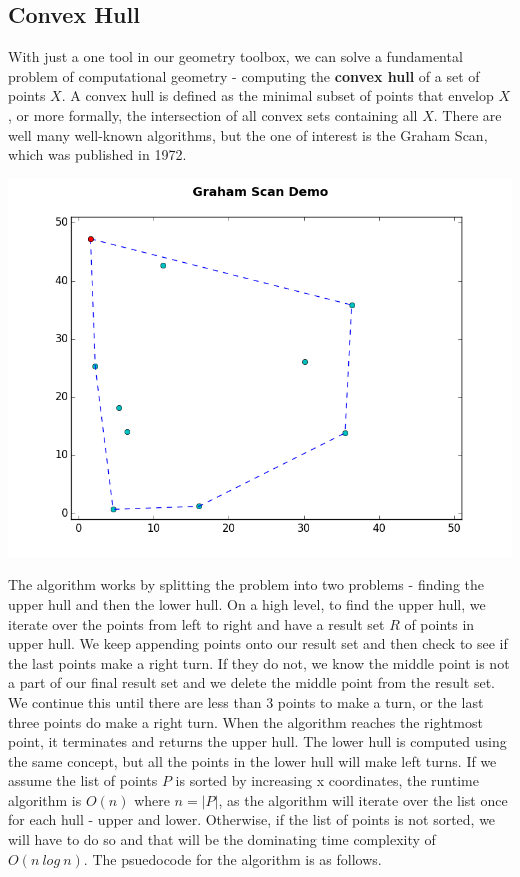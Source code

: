 \documentclass[10pt]{article}
\begin{document}
\begin{multicols}{2}
\subsection{Convex Hull}
\indent With just a one tool in our geometry toolbox, we can solve a fundamental problem of computational geometry - computing the \textbf{convex hull} of a set of points $X$. A convex hull is defined as the minimal subset of points that envelop $X$, or more formally, the intersection of all convex sets containing all $X$. There are well many well-known algorithms, but the one of interest is the Graham Scan, which was published in 1972. \newline \\
\centerline{\includegraphics[scale=0.4]{graham_scan.png}}
\indent The algorithm works by splitting the problem into two problems - finding the upper hull and then the lower hull. On a high level, to find the upper hull, we iterate over the points from left to right and have a result set $R$ of points in upper hull. We keep appending points onto our result set and then check to see if the last points make a right turn. If they do not, we know the middle point is not a part of our final result set and we delete the middle point from the result set. We continue this until there are less than 3 points to make a turn, or the last three points do make a right turn. When the algorithm reaches the rightmost point, it terminates and returns the upper hull. The lower hull is computed using the same concept, but all the points in the lower hull will make left turns. \newline
\indent If we assume the list of points $P$ is sorted by increasing x coordinates, the runtime algorithm is $O(n)$ where $n = |P|$, as the algorithm will iterate over the list once for each hull - upper and lower. Otherwise, if the list of points is not sorted, we will have to do so and that will be the dominating time complexity of $O(n\ log\ n)$.  The psuedocode for the algorithm is as follows. \newline \\

\end{multicols}
\end{document}

